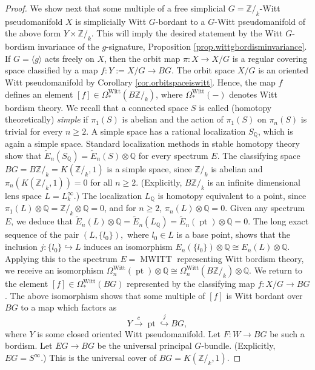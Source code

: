 \documentclass{amsart}
\theoremstyle{definition}
\theoremstyle{remark}
\newcommand {\intg}  {\ensuremath{\mathbb{Z}}}
\newcommand {\rat}   {\ensuremath{\mathbb{Q}}}
\newcommand {\pt}    {\ensuremath{\operatorname{pt}}}
\newcommand {\Witt}   {{\ensuremath{\operatorname{Witt}}}}
\newcommand {\MWITT}   {\ensuremath{\operatorname{MWITT}}}
\begin{document}
\begin{proof}
We show next that some multiple of a free simplicial $G=\intg/_k$-Witt pseudomanifold $X$
is simplicially Witt $G$-bordant to a $G$-Witt pseudomanifold of the above form 
$Y \times \intg/_k$. This will imply the desired statement by the
Witt $G$-bordism invariance of the $g$-signature,
Proposition \ref{prop.wittgbordisminvariance}.
If $G=\langle g \rangle$ acts freely on $X$, then the orbit map
$\pi: X \to X/G$ is a regular covering space classified by a map
$f: Y := X/G \to BG$. The orbit space $X/G$ is an oriented Witt pseudomanifold by
Corollary \ref{cor.orbitspaceiswitt}.
Hence, the map $f$ defines an element
$[f] \in \Omega^\Witt_* (B\intg/_k)$, where $\Omega^\Witt_* (-)$ denotes
Witt bordism theory.
We recall that a connected space $S$ is called (homotopy theoretically) 
\emph{simple} if $\pi_1 (S)$ is abelian and the action of
$\pi_1 (S)$ on $\pi_n (S)$ is trivial for every $n\geq 2$.
A simple space has a rational localization $S_\rat$, which is again a simple space.
Standard localization methods in stable homotopy theory show that
$\widetilde{E}_n (S_\rat) = \widetilde{E}_n (S) \otimes \rat$
for every spectrum $E$.
The classifying space $BG=B\intg/_k = K(\intg/_k, 1)$ is a simple
space, since $\intg/_k$ is abelian and $\pi_n (K(\intg/_k, 1))=0$ for all
$n\geq 2$. (Explicitly, $B\intg/_k$ is an infinite dimensional lens space
$L = L^\infty_k$.)
The localization $L_\rat$ is homotopy equivalent to a point, since
$\pi_1 (L) \otimes \rat = \intg/_k \otimes \rat =0$,
and for $n\geq 2$, $\pi_n (L) \otimes \rat =0$.
Given any spectrum $E$, we deduce that
$\widetilde{E}_n (L) \otimes \rat = \widetilde{E}_n (L_\rat) 
= \widetilde{E}_n (\pt) \otimes \rat =0.$
The long exact sequence of the pair $(L, \{ l_0 \}),$ where $l_0 \in L$ is a base point,
shows that the inclusion $j:\{ l_0 \} \hookrightarrow L$
induces an isomorphism
$E_n (\{ l_0 \}) \otimes \rat \cong
   E_n (L) \otimes \rat.$
Applying this to the spectrum $E=\MWITT$ representing Witt bordism theory,
we receive an isomorphism
$\Omega^\Witt_n (\pt) \otimes \rat \cong
   \Omega^\Witt_n (B\intg/_k) \otimes \rat.$
We return to the element
$[f] \in \Omega^\Witt_* (BG)$ represented by the classifying map $f:X/G \to BG$.
The above isomorphism shows that some multiple of $[f]$ is
Witt bordant over $BG$ to a map which factors as
\[ Y \stackrel{c}{\longrightarrow} 
    \pt \stackrel{j}{\hookrightarrow}
     BG, \]
where $Y$ is some closed oriented Witt pseudomanifold.     
Let $F:W \to BG$ be such a bordism.     
Let $EG \to BG$ be the universal principal $G$-bundle.
(Explicitly, $EG = S^\infty$.) This is the universal cover of $BG=K(\intg/_k, 1)$.

\end{proof}
\end{document}
